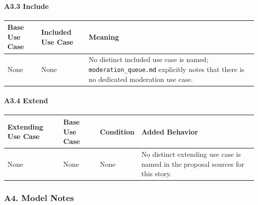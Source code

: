 \documentclass[12pt]{article}
\renewcommand{\baselinestretch}{1.5}
\begin{document}
\hypertarget{sec:a3-3-include}{}
\paragraph*{A3.3 Include}
\par\medskip

\begingroup
\small
\renewcommand{\baselinestretch}{1.0}\selectfont
\renewcommand{\arraystretch}{1.15}
\setlength{\tabcolsep}{6pt}
\begin{longtable}{|>{\raggedright\arraybackslash}p{}|>{\raggedright\arraybackslash}p{}|>{\raggedright\arraybackslash}p{}|}
\hline
\textbf{Base Use Case} & \textbf{Included Use Case} & \textbf{Meaning} \\ \hline
\endhead
None & None & No distinct included use case is named; \texttt{moderation\_queue.md} explicitly notes that there is no dedicated moderation use case. \\ \hline
\end{longtable}
\endgroup
\par\medskip

\hypertarget{sec:a3-4-extend}{}
\paragraph*{A3.4 Extend}
\par\medskip

\begingroup
\small
\renewcommand{\baselinestretch}{1.0}\selectfont
\renewcommand{\arraystretch}{1.15}
\setlength{\tabcolsep}{6pt}
\begin{longtable}{|>{\raggedright\arraybackslash}p{}|>{\raggedright\arraybackslash}p{}|>{\raggedright\arraybackslash}p{}|>{\raggedright\arraybackslash}p{}|}
\hline
\textbf{Extending Use Case} & \textbf{Base Use Case} & \textbf{Condition} & \textbf{Added Behavior} \\ \hline
\endhead
None & None & None & No distinct extending use case is named in the proposal sources for this story. \\ \hline
\end{longtable}
\endgroup
\par\medskip

\hypertarget{sec:a4-model-notes}{}
\subsubsection*{A4. Model Notes}
\par\medskip
\end{document}
